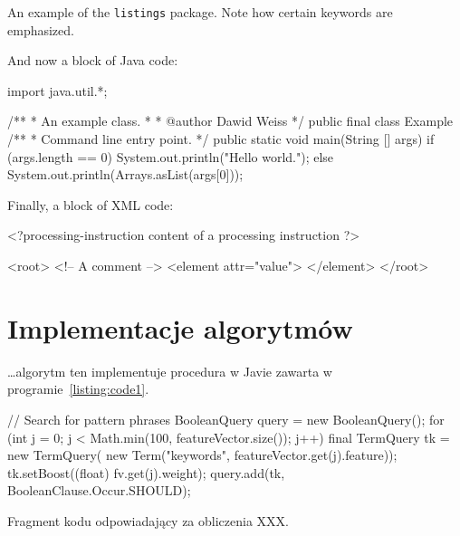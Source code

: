 \documentclass[polish]{article}
\begin{document}
\noindent
An example of the \texttt{listings} package. Note how certain
keywords are emphasized.



\bigskip\noindent
And now a block of Java code:

\begin{javablock}
import java.util.*;

/**
 * An example class.
 *
 * @author Dawid Weiss
 */
public final class Example {
	/**
	 * Command line entry point.
	 */
	public static void main(String [] args) {
		if (args.length == 0) {
			System.out.println("Hello world.");
		} else {
			System.out.println(Arrays.asList(args[0]));
		}
	}
}
\end{javablock}

\bigskip\noindent
Finally, a block of XML code:
\begin{xmlblock}
<?processing-instruction content of a processing instruction ?>

<root>
  <!-- A comment -->
  <element attr="value">
  </element>
</root>
\end{xmlblock}

\section{Implementacje algorytmów}

\noindent\ldots algorytm ten implementuje procedura w Javie zawarta w programie~\vref{listing:code1}. 

\begin{Program}[p]
\begin{javablock}
// Search for pattern phrases
BooleanQuery query = new BooleanQuery();
for (int j = 0; j < Math.min(100, featureVector.size()); j++) {
    final TermQuery tk = new TermQuery(
        new Term("keywords", featureVector.get(j).feature));
    tk.setBoost((float) fv.get(j).weight);
    query.add(tk, BooleanClause.Occur.SHOULD);
}
\end{javablock}
\caption{Fragment kodu odpowiadający za obliczenia XXX.}\label{listing:code1}%
\end{Program}
 
\end{document}

